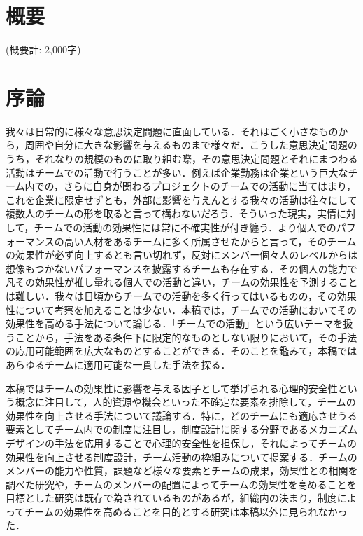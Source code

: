 \documentclass[a4paper, 11pt]{jsarticle}
\begin{document}
\maketitle

\hspace{0pt}
\vfill
\tableofcontents
\thispagestyle{empty}
\vfill
\hspace{0pt}
\newpage
\section*{概要}
(概要計: 2,000字) 
\section{序論}
我々は日常的に様々な意思決定問題に直面している．それはごく小さなものから，周囲や自分に大きな影響を与えるものまで様々だ．こうした意思決定問題のうち，それなりの規模のものに取り組む際，その意思決定問題とそれにまつわる活動はチームでの活動で行うことが多い．例えば企業勤務は企業という巨大なチーム内での，さらに自身が関わるプロジェクトのチームでの活動に当てはまり，これを企業に限定せずとも，外部に影響を与えんとする我々の活動は往々にして複数人のチームの形を取ると言って構わないだろう．そういった現実，実情に対して，チームでの活動の効果性には常に不確実性が付き纏う．より個人でのパフォーマンスの高い人材をあるチームに多く所属させたからと言って，そのチームの効果性が必ず向上するとも言い切れず，反対にメンバー個々人のレベルからは想像もつかないパフォーマンスを披露するチームも存在する．その個人の能力で凡その効果性が推し量れる個人での活動と違い，チームの効果性を予測することは難しい．我々は日頃からチームでの活動を多く行ってはいるものの，その効果性について考察を加えることは少ない．本稿では，チームでの活動においてその効果性を高める手法について論じる．「チームでの活動」という広いテーマを扱うことから，手法をある条件下に限定的なものとしない限りにおいて，その手法の応用可能範囲を広大なものとすることができる．そのことを鑑みて，本稿ではあらゆるチームに適用可能な一貫した手法を探る．

本稿ではチームの効果性に影響を与える因子として挙げられる心理的安全性という概念に注目して，人的資源や機会といった不確定な要素を排除して，チームの効果性を向上させる手法について議論する．特に，どのチームにも適応させうる要素としてチーム内での制度に注目し，制度設計に関する分野であるメカニズムデザインの手法を応用することで心理的安全性を担保し，それによってチームの効果性を向上させる制度設計，チーム活動の枠組みについて提案する．チームのメンバーの能力や性質，課題など様々な要素とチームの成果，効果性との相関を調べた研究や，チームのメンバーの配置によってチームの効果性を高めることを目標とした研究は既存で為されているものがあるが，組織内の決まり，制度によってチームの効果性を高めることを目的とする研究は本稿以外に見られなかった．
\end{document}
